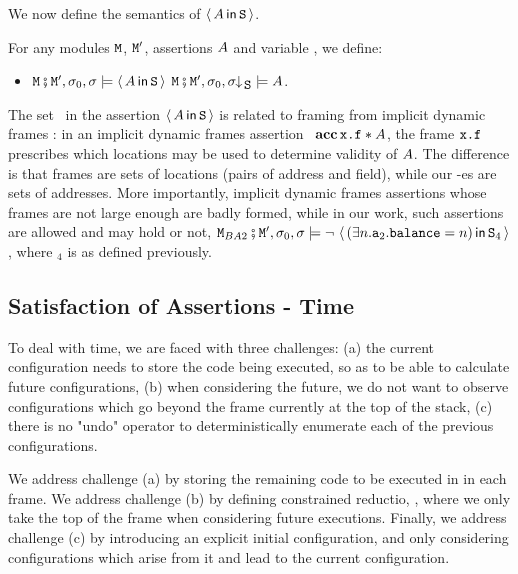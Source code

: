 We now define the semantics of $\langle\, A\, \mathsf{in}\, {\mbox{\tt{S}}}\, \rangle$.



\begin{definition}[Space]  \label{def:valid:assertion:space} 
For any modules ${\mbox{\tt{\ensuremath{{\mbox{\tt{M}}}}}}}$, ${\mbox{\tt{\ensuremath{{\mbox{\tt{M}}}}}}}'$, assertions $A$ and variable , we define$:$
\begin{itemize}
\item
 ${\mbox{\tt{\ensuremath{{\mbox{\tt{M}}}}}}}\fatsemi {\mbox{\tt{\ensuremath{{\mbox{\tt{M}}}}}}}', \sigma_0 , \sigma \models \langle\, A\, \mathsf{in}\, {\mbox{\tt{S}}}\, \rangle$
 \IFF
 ${\mbox{\tt{\ensuremath{{\mbox{\tt{M}}}}}}}\fatsemi {\mbox{\tt{\ensuremath{{\mbox{\tt{M}}}}}}}', \sigma_0 , \sigma\!\!\downarrow\!_{{\mbox{\tt{S}}}} \models  A  $.
\end{itemize}
\end{definition}

The set \SF\ in the assertion $\langle\, A\, \mathsf{in}\, {\mbox{\tt{S}}}\, \rangle$ is related to  framing  from implicit dynamic frames \cite{IDF}:
 in an implicit dynamic frames assertion  \ $\textbf{acc}\, {\mbox{\tt{x.f}}}  * A$, the frame ${\mbox{\tt{x.f}}}$ prescribes which locations
 may be used to determine validity of $A$.
The difference is that frames are sets of locations (pairs of address and field), while our -es are sets of addresses.
 More  importantly,   implicit dynamic frames assertions whose frames are not large enough are badly formed, 
 while in our work, such assertions
are allowed and may   hold %
or not, \eg   %
 ${\mbox{\tt{\ensuremath{{\mbox{\tt{M}}}}}}}_{BA2}\fatsemi {\mbox{\tt{\ensuremath{{\mbox{\tt{M}}}}}}}', \sigma_0 , \sigma  \models \neg\ \langle\, (\exists n.{{\mbox{\tt{a}}}}_2.{\mbox{\tt{balance}}}=n)\, \mathsf{in}\, {\mbox{\tt{S}}}_4\, \rangle$,
where $_4$ is as defined previously.
 
 

\subsection{Satisfaction of Assertions - Time}
\label{sect:time} 
To deal with time, we are faced with three challenges: (a) the current configuration needs to store the code being executed, so
as to be able to calculate future configurations, (b) when considering the future, we do not want to observe 
configurations which go beyond the frame currently at the top of the stack, (c) there is no "undo" operator to deterministically enumerate
each of the previous configurations. 

We address challenge (a) by storing the remaining code to be executed in  in each frame. 
We address challenge (b) by defining constrained reductio, , where we only take the top of the frame when considering future executions.
Finally, we address challenge (c) by introducing an explicit initial configuration, and only considering configurations which arise from it and lead to the current configuration.

